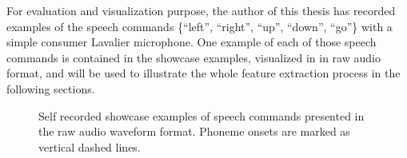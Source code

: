 For evaluation and visualization purpose, the author of this thesis has recorded examples of the speech commands \{\enquote{left}, \enquote{right}, \enquote{up}, \enquote{down}, \enquote{go}\} with a simple consumer Lavalier microphone.
One example of each of those speech commands is contained in the showcase examples, visualized in  in raw audio format, and will be used to illustrate the whole feature extraction process in the following sections.
\begin{figure}[!ht]
  \centering
    \quad
    \quad
  \caption{Self recorded showcase examples of speech commands presented in the raw audio waveform format. Phoneme onsets are marked as vertical dashed lines.}
  \label{fig:signal_raw_showcase}
\end{figure}
